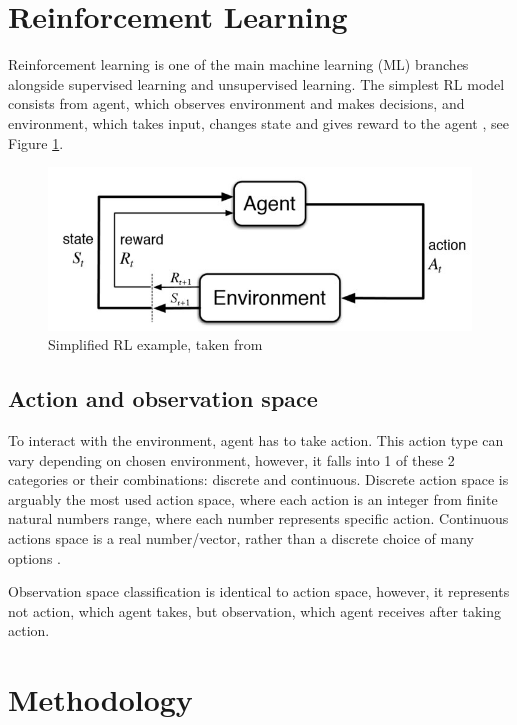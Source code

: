 \documentclass[12pt, a4paper]{article}
\begin{document}
\newpage

\section{Reinforcement Learning}

Reinforcement learning is one of the main machine learning (ML) branches alongside supervised learning and unsupervised learning. The simplest RL model consists from agent, which observes environment and makes decisions, and environment, which takes input, changes state and gives reward to the agent \cite{Sutton1998}, see Figure \ref{rlexample}.

\begin{figure}[h]
    \centering
    \includegraphics[width=.8\linewidth]{rl.jpg}
    \caption{Simplified RL example, taken from \cite{Sutton1998}}
    \label{rlexample}
\end{figure}

\subsection{Action and observation space}

To interact with the environment, agent has to take action. This action type can vary depending on chosen environment, however, it falls into 1 of these 2 categories or their combinations: discrete and continuous. Discrete action space is arguably the most used action space, where each action is an integer from finite natural numbers range, where each number represents specific action. Continuous actions space is a real number/vector, rather than a discrete choice of many options \cite{kanervisto:2020}.

Observation space classification is identical to action space, however, it represents not action, which agent takes, but observation, which agent receives after taking action.

\newpage

\section{Methodology}
\end{document}
